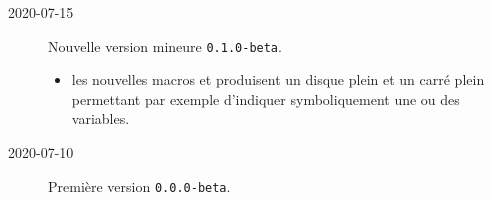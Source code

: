 \documentclass[12pt,a4paper]{article}
\begin{document}
\begin{description}
    \medskip
    \item[2020-07-15] Nouvelle version mineure \verb+0.1.0-beta+.
    
    \begin{itemize}[itemsep=.5em]
        \item {} les nouvelles macros  et  produisent un disque plein et un carré plein permettant par exemple d'indiquer symboliquement une ou des variables.
    \end{itemize}
    
    \separation


    \medskip
    \item[2020-07-10] Première version \verb+0.0.0-beta+.

\end{description}
\end{document}
